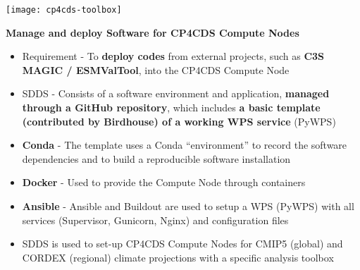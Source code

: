\documentclass[landscape,a0paper,fontscale=0.4]{baposter} %
\newcommand{\compresslist}{%
\setlength{\itemsep}{1pt}%
\setlength{\parskip}{0pt}%
\setlength{\parsep}{0pt}%
}
\begin{document}
\begin{poster}
{  \begin{minipage}{0.4\textwidth}
    \texttt{[image: cp4cds-toolbox]}
  \end{minipage}
  \begin{minipage}{0.6\textwidth}
    {\bf Manage and deploy Software for CP4CDS Compute Nodes}
    \begin{itemize}\compresslist
      \item Requirement - To {\bf deploy codes} from external projects,
        such as {\bf C3S MAGIC / ESMValTool}, into the CP4CDS Compute Node
      \item SDDS - Consists of a software environment and application, {\bf managed through a GitHub repository},
        which includes {\bf a basic template (contributed by Birdhouse) of a working WPS service} (PyWPS)
      \item {\bf Conda} -  The template uses a Conda ``environment'' to record the software dependencies
        and to build a reproducible software installation
      \item {\bf Docker} - Used to provide the Compute Node through containers
      \item {\bf Ansible} - Ansible and Buildout are used to setup a WPS (PyWPS) with all services
        (Supervisor, Gunicorn, Nginx) and configuration files
      \item SDDS is used to set-up CP4CDS Compute Nodes for CMIP5 (global) and CORDEX (regional) climate projections with
        a specific analysis toolbox
    \end{itemize}
  \end{minipage}


}
\end{poster}
\end{document}
